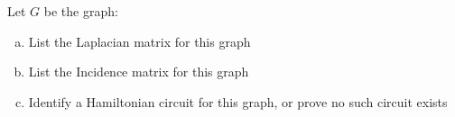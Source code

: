 \documentclass[10pt,letterpaper, cm]{hmcpset}
\begin{document}
\begin{problem}[11]
    Let $G$ be the graph:
    \begin{center}
    \end{center}

    \begin{enumerate}[(a)]
        \item List the Laplacian matrix for this graph
        \item List the Incidence matrix for this graph
        \item Identify a Hamiltonian circuit for this graph, or prove no such circuit exists
        \end{enumerate}
\end{problem}
\end{document}
